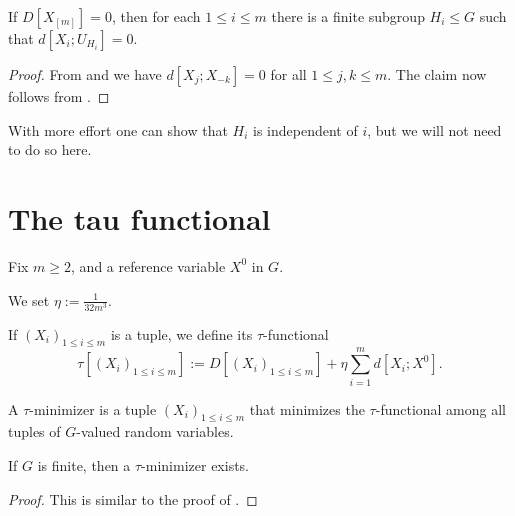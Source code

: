 \begin{proposition}[Vanishing]\label{multi-zero}\leanok
If $D[X_{[m]}]=0$, then for each $1 \leq i \leq m$ there is a finite subgroup $H_i \leq G$ such that $d[X_i; U_{H_i}] = 0$.
\end{proposition}

\begin{proof}  From  and  we have $d[X_j; X_{-k}]=0$ for all $1 \leq j,k \leq m$.  The claim now follows from .
\end{proof}

With more effort one can show that $H_i$ is independent of $i$, but we will not need to do so here.

\section{The tau functional}

Fix $m \geq 2$, and a reference variable $X^0$ in $G$.

\begin{definition}[$\eta$]\label{eta-def-multi}\leanok
We set $\eta := \frac{1}{32m^3}$.
\end{definition}

\begin{definition}\label{tau-def-multi}\leanok  If $(X_i)_{1 \leq i \leq m}$ is a tuple, we define its $\tau$-functional
$$ \tau[ (X_i)_{1 \leq i \leq m}] := D[(X_i)_{1 \leq i \leq m}] + \eta \sum_{i=1}^m d[X_i; X^0].$$
\end{definition}

\begin{definition}\label{tau-min-multi}\leanok  A $\tau$-minimizer is a tuple $(X_i)_{1 \leq i \leq m}$ that minimizes the $\tau$-functional among all tuples of $G$-valued random variables.
\end{definition}

\begin{proposition}\label{tau-min-exist-multi}\leanok  If $G$ is finite, then a $\tau$-minimizer exists.
\end{proposition}

\begin{proof} This is similar to the proof of .
\end{proof}

